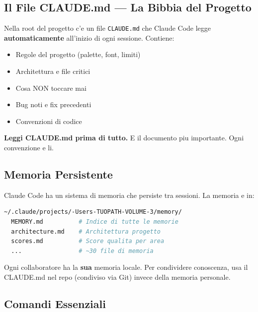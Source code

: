 \documentclass[11pt,a4paper]{article}
\begin{document}
\subsection{Il File CLAUDE.md --- La Bibbia del Progetto}

Nella root del progetto c'e un file \texttt{CLAUDE.md} che Claude Code legge \textbf{automaticamente} all'inizio di ogni sessione. Contiene:

\begin{itemize}[leftmargin=2em]
  \item Regole del progetto (palette, font, limiti)
  \item Architettura e file critici
  \item Cosa NON toccare mai
  \item Bug noti e fix precedenti
  \item Convenzioni di codice
\end{itemize}

\begin{consiglio}
\textbf{Leggi CLAUDE.md prima di tutto.} E il documento piu importante. Ogni convenzione e li.
\end{consiglio}

\subsection{Memoria Persistente}

Claude Code ha un sistema di memoria che persiste tra sessioni. La memoria e in:

\begin{lstlisting}[language=bash]
~/.claude/projects/-Users-TUOPATH-VOLUME-3/memory/
  MEMORY.md          # Indice di tutte le memorie
  architecture.md    # Architettura progetto
  scores.md          # Score qualita per area
  ...                # ~30 file di memoria
\end{lstlisting}

\begin{consiglio}
Ogni collaboratore ha la \textbf{sua} memoria locale. Per condividere conoscenza, usa il CLAUDE.md nel repo (condiviso via Git) invece della memoria personale.
\end{consiglio}

\subsection{Comandi Essenziali}
\end{document}
